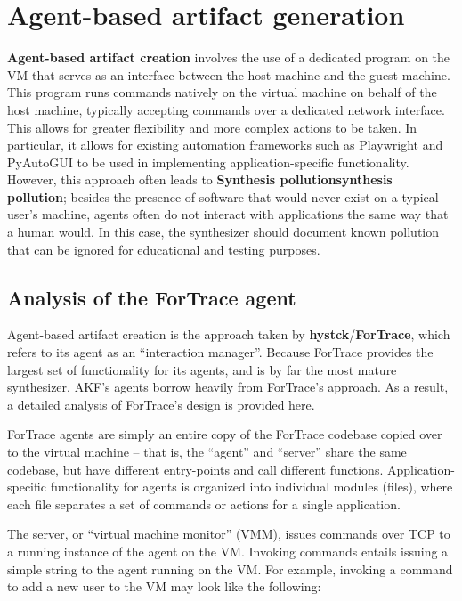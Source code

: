 \documentclass[letterpaper,12pt]{report}
\begin{document}
\section{Agent-based artifact
generation}\label{agent-based-artifact-generation}

\textbf{Agent-based artifact creation} involves the use of a dedicated
program on the VM that serves as an interface between the host machine
and the guest machine. This program runs commands natively on the
virtual machine on behalf of the host machine, typically accepting
commands over a dedicated network interface. This allows for greater
flexibility and more complex actions to be taken. In particular, it
allows for existing automation frameworks such as Playwright and
PyAutoGUI to be used in implementing application-specific functionality.
However, this approach often leads to \textbf{Synthesis
pollution\textbar synthesis pollution}; besides the presence of software
that would never exist on a typical user's machine, agents often do not
interact with applications the same way that a human would. In this
case, the synthesizer should document known pollution that can be
ignored for educational and testing purposes.

\subsection{Analysis of the ForTrace
agent}\label{analysis-of-the-fortrace-agent}

Agent-based artifact creation is the approach taken by
\textbf{hystck}/\textbf{ForTrace}, which refers to its agent as an
``interaction manager''. Because ForTrace provides the largest set of
functionality for its agents, and is by far the most mature synthesizer,
AKF's agents borrow heavily from ForTrace's approach. As a result, a
detailed analysis of ForTrace's design is provided here.

ForTrace agents are simply an entire copy of the ForTrace codebase
copied over to the virtual machine -- that is, the ``agent'' and
``server'' share the same codebase, but have different entry-points and
call different functions. Application-specific functionality for agents
is organized into individual modules (files), where each file separates
a set of commands or actions for a single application.

The server, or ``virtual machine monitor'' (VMM), issues commands over
TCP to a running instance of the agent on the VM. Invoking commands
entails issuing a simple string to the agent running on the VM. For
example, invoking a command to add a new user to the VM may look like
the following:
\end{document}

